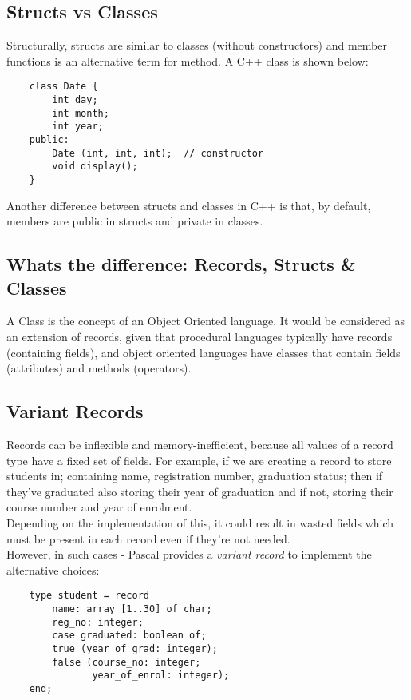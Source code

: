 \subsection{Structs vs Classes}
Structurally, structs are similar to classes (without constructors) and member functions is an alternative term for method. A C++ class is shown below:
\begin{verbatim}
    class Date {
        int day;
        int month;
        int year;
    public:
        Date (int, int, int);  // constructor
        void display();
    }
\end{verbatim}
Another difference between structs and classes in C++ is that, by default, members are public in structs and private in classes.

\subsection{Whats the difference: Records, Structs \& Classes}
A Class is the concept of an Object Oriented language. It would be considered as an extension of records, given that procedural languages typically have records (containing fields), and object oriented languages have classes that contain fields (attributes) and methods (operators). 

\subsection{Variant Records}
Records can be inflexible and memory-inefficient, because all values of a record type have a fixed set of fields. For example, if we are creating a record to store students in; containing name, registration number, graduation status; then if they've graduated also storing their year of graduation and if not, storing their course number and year of enrolment.\\

Depending on the implementation of this, it could result in wasted fields which must be present in each record even if they're not needed.\\

However, in such cases - Pascal provides a \textit{variant record} to implement the alternative choices:
\begin{verbatim}
    type student = record
        name: array [1..30] of char;
        reg_no: integer;
        case graduated: boolean of;
        true (year_of_grad: integer);
        false (course_no: integer;
               year_of_enrol: integer);
    end;
\end{verbatim}

